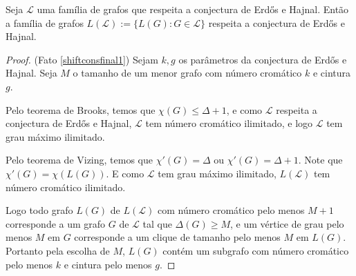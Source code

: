 \begin{fato}\label{shiftconsfinal1}
Seja $\mathcal{L}$ uma família de grafos que respeita a conjectura de Erd\H{o}s e Hajnal. Então a família de grafos $L(\mathcal{L}) := \{L(G) : G\in\mathcal{L}\}$ respeita a conjectura de Erd\H{o}s e Hajnal.
\end{fato}

\begin{proof}(Fato \ref{shiftconsfinal1})
Sejam $k,g$ os parâmetros da conjectura de Erd\H{o}s e Hajnal. Seja $M$ o tamanho de um menor grafo com número cromático $k$ e cintura $g$. 

Pelo teorema de Brooks, temos que $\chi(G) \leq \Delta+1$, e como $\mathcal{L}$ respeita a conjectura de Erd\H{o}s e Hajnal, $\mathcal{L}$ tem número cromático ilimitado, e logo $\mathcal{L}$ tem grau máximo ilimitado.

Pelo teorema de Vizing, temos que $\chi'(G) = \Delta$ ou $\chi'(G) = \Delta+1$. Note que $\chi'(G) = \chi(L(G))$. E como $\mathcal{L}$ tem grau máximo ilimitado, $L(\mathcal{L})$ tem número cromático ilimitado.

Logo todo grafo $L(G)$ de $L(\mathcal{L})$ com número cromático pelo menos $M+1$ corresponde a um grafo $G$ de $\mathcal{L}$ tal que $\Delta(G) \geq M$, e um vértice de grau pelo menos $M$ em $G$ corresponde a um clique de tamanho pelo menos $M$ em $L(G)$. Portanto pela escolha de $M$, $L(G)$ contém um subgrafo com número cromático pelo menos $k$ e cintura pelo menos $g$.
\end{proof}